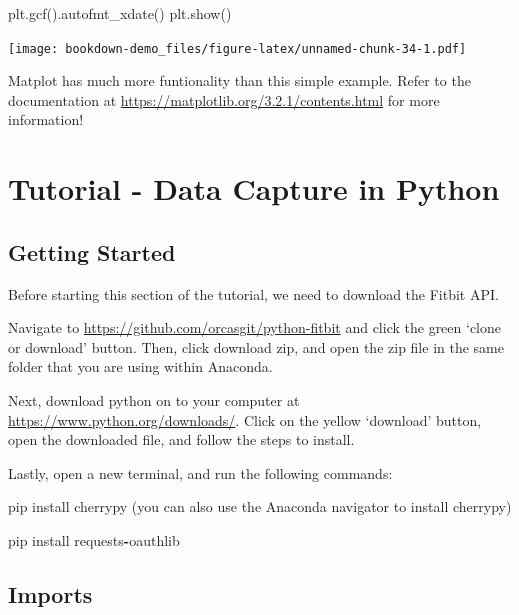 \documentclass[]{book}
\newenvironment{Shaded}{\begin{snugshade}}{\end{snugshade}}
\newcommand{\OperatorTok}[1]{\textcolor[rgb]{0.81,0.36,0.00}{\textbf{#1}}}
\newcommand{\NormalTok}[1]{#1}
\begin{document}
\begin{Shaded}
\begin{Highlighting}[]
\NormalTok{plt.gcf().autofmt_xdate()}
\NormalTok{plt.show()}
\end{Highlighting}
\end{Shaded}

\texttt{[image: bookdown-demo\_files/figure-latex/unnamed-chunk-34-1.pdf]}

Matplot has much more funtionality than this simple example. Refer to
the documentation at \url{https://matplotlib.org/3.2.1/contents.html}
for more information!

\chapter{Tutorial - Data Capture in
Python}\label{tutorial---data-capture-in-python}

\section{Getting Started}\label{getting-started}

Before starting this section of the tutorial, we need to download the
Fitbit API.

Navigate to \url{https://github.com/orcasgit/python-fitbit} and click
the green `clone or download' button. Then, click download zip, and open
the zip file in the same folder that you are using within Anaconda.

Next, download python on to your computer at
\url{https://www.python.org/downloads/}. Click on the yellow `download'
button, open the downloaded file, and follow the steps to install.

Lastly, open a new terminal, and run the following commands:

\begin{Shaded}
\begin{Highlighting}[]
\NormalTok{pip install cherrypy (you can also use the Anaconda navigator to install cherrypy)}

\NormalTok{pip install requests}\OperatorTok{-}\NormalTok{oauthlib  }
\end{Highlighting}
\end{Shaded}

\section{Imports}\label{imports}
\end{document}
